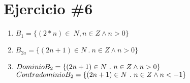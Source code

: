 \documentclass{article}
\begin{document}
\section*{Ejercicio \#6}

\begin{enumerate}

    \item $B_1 = \{ (2*n) \in \ N, n \in Z \wedge n > 0 \}$

    \item $B_{2a} = \{ (2n + 1) \in N \ . \ n \in Z \wedge n > 0 \}$

    \item $Dominio \\ B_2= \{ (2n+1) \in N \ . \ n \in Z \wedge n > 0 \}$ \\ $Contradominio \\ B_2 = \{ (2n+1) \in N \ . \ n \in Z \wedge n < -1 \} $

\end{enumerate}
\end{document}

